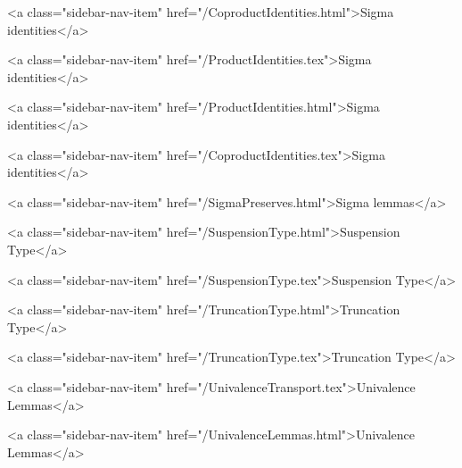       
    
      
        
          <a class="sidebar-nav-item" href="/CoproductIdentities.html">Sigma identities</a>
        
      
    
      
        
          <a class="sidebar-nav-item" href="/ProductIdentities.tex">Sigma identities</a>
        
      
    
      
        
          <a class="sidebar-nav-item" href="/ProductIdentities.html">Sigma identities</a>
        
      
    
      
        
          <a class="sidebar-nav-item" href="/CoproductIdentities.tex">Sigma identities</a>
        
      
    
      
        
          <a class="sidebar-nav-item" href="/SigmaPreserves.html">Sigma lemmas</a>
        
      
    
      
        
          <a class="sidebar-nav-item" href="/SuspensionType.html">Suspension Type</a>
        
      
    
      
        
          <a class="sidebar-nav-item" href="/SuspensionType.tex">Suspension Type</a>
        
      
    
      
        
          <a class="sidebar-nav-item" href="/TruncationType.html">Truncation Type</a>
        
      
    
      
        
          <a class="sidebar-nav-item" href="/TruncationType.tex">Truncation Type</a>
        
      
    
      
        
          <a class="sidebar-nav-item" href="/UnivalenceTransport.tex">Univalence Lemmas</a>
        
      
    
      
        
          <a class="sidebar-nav-item" href="/UnivalenceLemmas.html">Univalence Lemmas</a>
        
